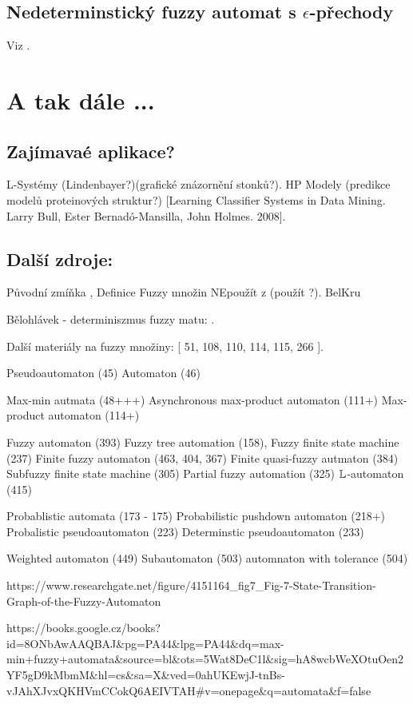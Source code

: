 \documentclass[a4paper,10pt]{article}
\begin{document}
\subsection{Nedeterminstický fuzzy automat s $\epsilon$-přechody}
Viz \cite{cao-ezawa-nondet-fuzz-aut}.

\newpage
\section{A tak dále ...}
\subsection{Zajímavaé aplikace?}
L-Systémy (Lindenbayer?)(grafické znázornění stonků?). HP Modely (predikce modelů proteinových struktur?) [Learning Classifier Systems in Data Mining.
Larry Bull, Ester Bernadó-Mansilla, John Holmes. 2008]. 
\subsection{Další zdroje:}
Původní zmíňka \cite{wee-adaptive-algs-and-fuz-set-concept}, Definice Fuzzy množin NEpoužít z \cite{zadeh-fuzzy-set} (použít \cite{belohlavek-fuzz-rel-syss}?). BelKru \cite{belohlavek-krupka-minimalization}

Bělohlávek - determiniszmus fuzzy matu: \cite{belohlavek-determinism}.

Další materiály na fuzzy množiny: [ 51, 108, 110, 114, 115, 266 ].

Pseudoautomaton (45)
Automaton (46)

Max-min autmata (48+++)
Asynchronous max-product automaton (111+)
Max-product automaton (114+)

Fuzzy automaton (393)
Fuzzy tree automation (158), 
Fuzzy finite state machine (237)
Finite fuzzy automaton (463, 404, 367)
Finite quasi-fuzzy autmaton (384)
Subfuzzy finite state machine (305)
Partial fuzzy automation (325)
$\mathbb{L}$-automaton (415)

Probablistic automata (173 - 175)
Probabilistic pushdown automaton (218+)
Probalistic pseudoautomaton (223)
Determinstic pseudoautomaton (233)


Weighted automaton (449)
Subautomaton (503)
automnaton with tolerance (504)


https://www.researchgate.net/figure/4151164\_fig7\_Fig-7-State-Transition-Graph-of-the-Fuzzy-Automaton

https://books.google.cz/books?id=8ONbAwAAQBAJ\&pg=PA44\&lpg=PA44\&dq=max-min+fuzzy+automata\&source=bl\&ots=5Wat8DeC1l\&sig=hA8wcbWeXOtuOen2YF5gD9kMbmM\&hl=cs\&sa=X\&ved=0ahUKEwjJ-tnBs-vJAhXJvxQKHVmCCokQ6AEIVTAH\#v=onepage\&q=automata\&f=false


\newpage


\end{document}
